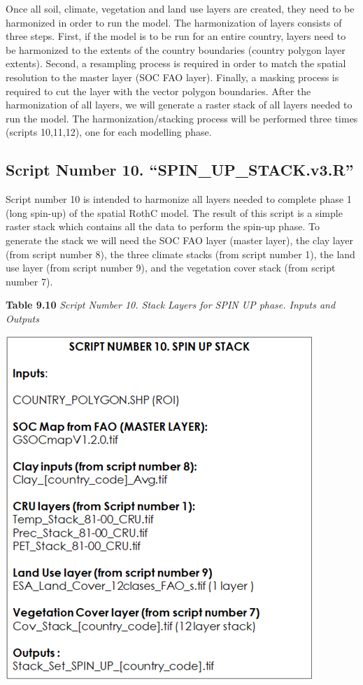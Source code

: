 \documentclass[
  10pt,
  b5paper,
]{book}
\begin{document}
Once all soil, climate, vegetation and land use layers are created, they need to be harmonized in order to run the model. The harmonization of layers consists of three steps. First, if the model is to be run for an entire country, layers need to be harmonized to the extents of the country boundaries (country polygon layer extents). Second, a resampling process is required in order to match the spatial resolution to the master layer (SOC FAO layer). Finally, a masking process is required to cut the layer with the vector polygon boundaries. After the harmonization of all layers, we will generate a raster stack of all layers needed to run the model. The harmonization/stacking process will be performed three times (scripts 10,11,12), one for each modelling phase.

\hypertarget{script-number-10.-spin_up_stack.v3.r}{%
\subsection{Script Number 10. ``SPIN\_UP\_STACK.v3.R''}\label{script-number-10.-spin_up_stack.v3.r}}

Script number 10 is intended to harmonize all layers needed to complete phase 1 (long spin-up) of the spatial RothC model. The result of this script is a simple raster stack which contains all the data to perform the spin-up phase. To generate the stack we will need the SOC FAO layer (master layer), the clay layer (from script number 8), the three climate stacks (from script number 1), the land use layer (from script number 9), and the vegetation cover stack (from script number 7).

\textbf{Table 9.10} \emph{Script Number 10. Stack Layers for SPIN UP phase. Inputs and Outputs}

\includegraphics{tables/Table_9.9.png}
\end{document}
